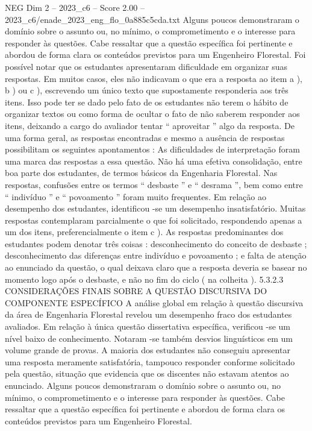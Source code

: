 \begin{textsample}{NEG Dim 2 – 2023\_c6 – Score 2.00 – 2023\_c6/enade\_2023\_eng\_flo\_0a885c5cda.txt}
Alguns poucos demonstraram o domínio sobre o assunto ou, no mínimo, o comprometimento e o interesse para responder às questões.
Cabe ressaltar que a questão específica foi pertinente e abordou de forma clara os conteúdos previstos para um Engenheiro Florestal.
Foi possível notar que os estudantes apresentaram dificuldade em organizar suas respostas.
Em muitos casos, eles não indicavam o que era a resposta ao item a ), b ) ou c ), escrevendo um único texto que supostamente responderia aos três itens.
Isso pode ter se dado pelo fato de os estudantes não terem o hábito de organizar textos ou como forma de ocultar o fato de não saberem responder aos itens, deixando a cargo do avaliador tentar “ aproveitar ” algo da resposta.
De uma forma geral, as respostas encontradas e mesmo a ausência de respostas possibilitam os seguintes apontamentos : As dificuldades de interpretação foram uma marca das respostas a essa questão.
Não há uma efetiva consolidação, entre boa parte dos estudantes, de termos básicos da Engenharia Florestal.
Nas respostas, confusões entre os termos “ desbaste ” e “ desrama ”, bem como entre “ indivíduo ” e “ povoamento ” foram muito frequentes.
Em relação ao desempenho dos estudantes, identificou -se um desempenho insatisfatório.
Muitas respostas contemplaram parcialmente o que foi solicitado, respondendo apenas a um dos itens, preferencialmente o item c ).
As respostas predominantes dos estudantes podem denotar três coisas : desconhecimento do conceito de desbaste ; desconhecimento das diferenças entre indivíduo e povoamento ; e falta de atenção ao enunciado da questão, o qual deixava claro que a resposta deveria se basear no momento logo após o desbaste, e não no fim do ciclo ( na colheita ). 5.3.2.3 CONSIDERAÇÕES FINAIS SOBRE A QUESTÃO DISCURSIVA DO COMPONENTE ESPECÍFICO A análise global em relação à questão discursiva da área de Engenharia Florestal revelou um desempenho fraco dos estudantes avaliados.
Em relação à única questão dissertativa específica, verificou -se um nível baixo de conhecimento.
Notaram -se também desvios linguísticos em um volume grande de provas.
A maioria dos estudantes não conseguiu apresentar uma resposta meramente satisfatória, tampouco responder conforme solicitado pela questão, situação que evidencia que os discentes não estavam atentos ao enunciado.
Alguns poucos demonstraram o domínio sobre o assunto ou, no mínimo, o comprometimento e o interesse para responder às questões.
Cabe ressaltar que a questão específica foi pertinente e abordou de forma clara os conteúdos previstos para um Engenheiro Florestal.

\end{textsample}
